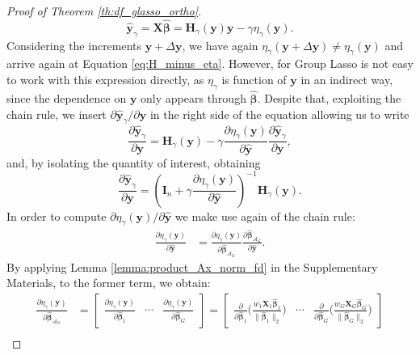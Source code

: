 \documentclass[a4paper, 12pt]{article}
\newcommand{\Aset}{\mathcal{A}}
\newcommand{\betahat}{\widehat{\boldsymbol\beta}}
\def\bbeta{\boldsymbol{\beta}}
\def\by{\boldsymbol{y}}
\def\bH{\mathbf{H}}
\def\bI{\mathbf{I}}
\def\bX{\mathbf{X}}
\def\by{\mathbf{y}}
\begin{document}
\begin{appendix}
\begin{proof}[Proof of Theorem \ref{th:df_glasso_ortho}]
\begin{equation*}
\widehat{\by}_\gamma=\bX\betahat=\bH_\gamma(\by)\by-\gamma\eta_\gamma(\by).
\end{equation*}
Considering the increments $\by+\Delta \by$, we have again $\eta_\gamma(\by+\Delta \by) \neq\eta_\gamma(\by)$ and arrive again at Equation \eqref{eq:H_minus_eta}. However, for Group Lasso is not easy to work with this expression directly, as $\eta_\gamma$ is function of $\by$ in an indirect way, since the dependence on $\by$ only appears through $\widehat{\bbeta}$. Despite that, exploiting the chain rule, we insert $\partial \widehat{\by}_\gamma / \partial \by$ in the right side of the equation allowing us to write
\begin{equation*}
\frac{\partial \widehat{\by}_\gamma}{\partial \by}=\bH_\gamma(\by)-\gamma \frac{\partial\eta_\gamma(\by)}{\partial \widehat{\by}}\frac{\partial \widehat{\by}_\gamma}{\partial\by},
\end{equation*}
and, by isolating the quantity of interest, obtaining
\begin{equation}
\label{eq:I_plus_eta_inverse_H}
\frac{\partial \widehat{\by}_\gamma}{\partial\by}=\left(\bI_n+\gamma \frac{\partial\eta_\gamma(\by)}{\partial \widehat{\by}}\right)^{-1} \bH_\gamma(\by). 
\end{equation}
In order to compute $\partial \eta_\gamma(\by)/\partial \widehat{\by}$ we make use again of the chain rule:
\begin{equation*}
\begin{aligned}
\frac{\partial\eta_\gamma(\by)}{\partial \widehat{\by}}&=  \frac{\partial\eta_\gamma(\by)}{\partial \betahat_{\Aset_G}}\frac{\partial\betahat_{\Aset_G}}{\partial \widehat{\by}}.
\end{aligned}
\end{equation*}
By applying Lemma \ref{lemma:product_Ax_norm_fd} in the Supplementary Materials, to the former term, we obtain:
\begin{equation*}
\begin{aligned}
\frac{\partial \eta_\gamma(\by)}{\partial\betahat_{\Aset_G}} &= \begin{bmatrix}\frac{\partial \eta_\gamma(\by)}{\partial\betahat_1}&  \cdots&\frac{\partial \eta_\gamma(\by)}{\partial\betahat_G}  \end{bmatrix}= \begin{bmatrix}\frac{\partial}{\partial \betahat_1} \bigg(\frac{ w_1 \bX_1\betahat_1}{\| \betahat_1 \|_2}\bigg) &\cdots& \frac{\partial}{\partial \betahat_G} \bigg(\frac{ w_G \bX_G\betahat_G}{\| \betahat_G \|_2}\bigg)
\end{bmatrix}\\

\end{aligned}
\end{equation*}
\end{proof}
\end{appendix}
\end{document}
